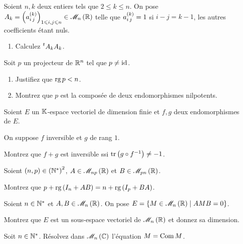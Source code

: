\begin{exo}
Soient \(n,k\) deux entiers tels que \(2\leq k\leq n\). On pose \(A_k=\paren{a_{i\,j}\deriv{k}}_{1\leq i,j\leq n}\in\M{n}[\R]\) telle que \(a_{i\,j}^{\left(k\right)}=1\) si \(i-j=k-1\), les autres coefficients étant nuls.

\begin{enumerate}[series=oral4.7]
    \item Calculez \(\prescript{t}{}{A_k}A_k\).
\end{enumerate}

Soit \(p\) un projecteur de \(\mathbb{R}^n\) tel que \(p\not=\mathrm{id}_{}\).

\begin{enumerate}[resume=oral4.7]
    \item Justifiez que \(\operatorname{rg} p<n\). \\
    \item Montrez que \(p\) est la composée de deux endomorphismes nilpotents.
\end{enumerate}
\end{exo}



\begin{exo}
Soient \(E\) un \(\mathbb{K}\)-espace vectoriel de dimension finie et \(f,g\) deux endomorphismes de \(E\).

On suppose \(f\) inversible et \(g\) de rang \(1\).

Montrez que \(f+g\) est inversible ssi \(\operatorname{tr}\left(g\circ f^{-1}\right)\not=-1\).
\end{exo}



\begin{exo}
Soient \(\left(n,p\right)\in\left(\mathbb{N}^*\right)^2\), \(A\in\M{np}[\R]\) et \(B\in\M{pn}[\R]\).

Montrez que \(p+\operatorname{rg}\left(I_n+AB\right)=n+\operatorname{rg}\left(I_p+BA\right)\).
\end{exo}



\begin{exo}
Soient \(n\in\mathbb{N}^*\) et \(A,B\in\M{n}[\R]\). On pose \(E=\accol{M\in\M{n}[\R]\tq AMB=0}\).

Montrez que \(E\) est un sous-espace vectoriel de \(\M{n}[\R]\) et donnez sa dimension.
\end{exo}



\begin{exo}
Soit \(n\in\mathbb{N}^*\). Résolvez dans \(\M{n}[\C]\) l'équation \(M=\operatorname{Com}M\).
\end{exo}


